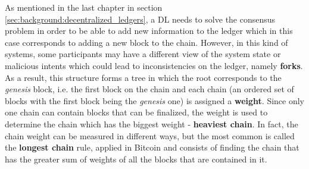 As mentioned in the last chapter in section \ref{sec:background:decentralized_ledgers}, a \gls{DL} needs to solve the consensus problem in order to be able to add new information to the ledger which in this case corresponds to adding a new block to the chain. However, in this kind of systems, some participants may have a different view of the system state or malicious intents which could lead to inconsistencies on the ledger, namely \textbf{forks}.
As a result, this structure forms a tree in which the root corresponds to the \textit{genesis} block, i.e. the first block on the chain and each chain (an ordered set of blocks with the first block being the \textit{genesis} one) is assigned a \textbf{weight}. Since only one chain can contain blocks that can be finalized, the weight is used to determine the chain which has the biggest weight - \textbf{heaviest chain}. In fact, the chain weight can be measured in different ways, but the most common is called the \textbf{longest chain} rule, applied in Bitcoin \cite{bitcoin} and consists of finding the chain that has the greater sum of weights of all the blocks that are contained in it.

